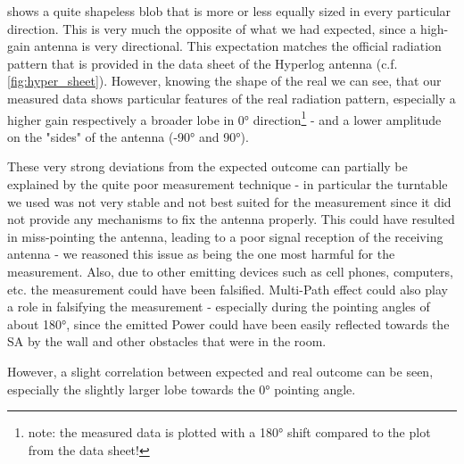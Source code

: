 
 shows a quite shapeless blob that is more or less equally sized in every particular direction. This is very much the opposite of what we had expected, since a high-gain antenna is very directional. This expectation matches the official radiation pattern that is provided in the data sheet of the Hyperlog antenna (c.f. \cref{fig:hyper_sheet}). However, knowing the shape of the real we can see, that our measured data shows particular features of the real radiation pattern, especially a higher gain respectively a broader lobe in 0° direction\footnote{note: the measured data is plotted with a 180° shift compared to the plot from the data sheet!} - and a lower amplitude on the "sides" of the antenna (-90° and 90°).

These very strong deviations from the expected outcome can partially be explained by the quite poor measurement technique - in particular the turntable we used was not very stable and not best suited for the measurement since it did not provide any mechanisms to fix the antenna properly. This could have resulted in miss-pointing the antenna, leading to a poor signal reception of the receiving antenna -  we reasoned this issue as being the one most harmful for the measurement. Also, due to other emitting devices such as cell phones, computers, etc. the measurement could have been falsified. Multi-Path effect could also play a role in falsifying the measurement - especially during the pointing angles of about 180°, since the emitted Power could have been easily reflected towards the SA by the wall and other obstacles that were in the room.

However, a slight correlation between expected and real outcome can be seen, especially the slightly larger lobe towards the 0° pointing angle.


